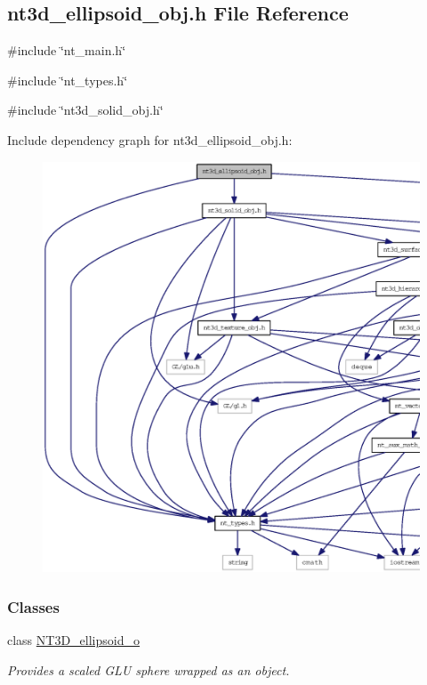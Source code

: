 \subsection{nt3d\_\-ellipsoid\_\-obj.h File Reference}
\label{nt3d__ellipsoid__obj_8h}
{\ttfamily \#include \char`\"{}nt\_\-main.h\char`\"{}}\par
{\ttfamily \#include \char`\"{}nt\_\-types.h\char`\"{}}\par
{\ttfamily \#include \char`\"{}nt3d\_\-solid\_\-obj.h\char`\"{}}\par
Include dependency graph for nt3d\_\-ellipsoid\_\-obj.h:
\nopagebreak
\begin{figure}[H]
\begin{center}
\leavevmode
\includegraphics[width=400pt]{nt3d__ellipsoid__obj_8h__incl}
\end{center}
\end{figure}
\subsubsection*{Classes}
\begin{DoxyCompactItemize}
\item 
class \hyperlink{class_n_t3_d__ellipsoid__o}{NT3D\_\-ellipsoid\_\-o}
\begin{DoxyCompactList}\small\item\em Provides a scaled GLU sphere wrapped as an object. \item\end{DoxyCompactList}\end{DoxyCompactItemize}
